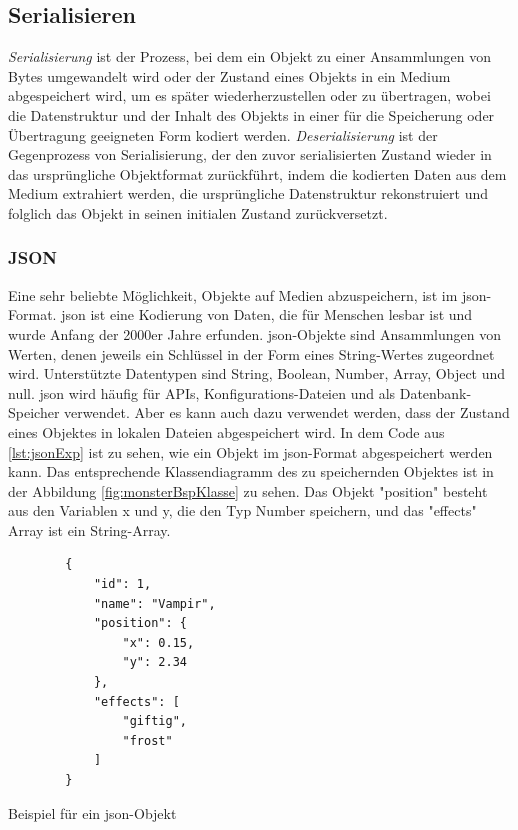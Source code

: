 \subsection{Serialisieren}

\textit{Serialisierung} ist der Prozess, bei dem ein Objekt zu einer Ansammlungen von Bytes umgewandelt wird oder der Zustand eines Objekts in ein Medium abgespeichert wird, um es später wiederherzustellen oder zu übertragen, wobei die Datenstruktur und der Inhalt des Objekts in einer für die Speicherung oder Übertragung geeigneten Form kodiert werden. \textit{Deserialisierung} ist der Gegenprozess von Serialisierung, der den zuvor serialisierten Zustand wieder in das ursprüngliche Objektformat zurückführt, indem die kodierten Daten aus dem Medium extrahiert werden, die ursprüngliche Datenstruktur rekonstruiert und folglich das Objekt in seinen initialen Zustand zurückversetzt.\cite{codeguruWorkingWith}

\subsubsection{JSON}
Eine sehr beliebte Möglichkeit, Objekte auf Medien abzuspeichern, ist im \ac{json}-Format. \ac{json} ist eine Kodierung von Daten, die für Menschen lesbar ist und wurde Anfang der 2000er Jahre erfunden. \ac{json}-Objekte sind Ansammlungen von Werten, denen jeweils ein Schlüssel in der Form eines String-Wertes zugeordnet wird. Unterstützte Datentypen sind String, Boolean, Number, Array, Object und null. \ac{json} wird häufig für APIs, Konfigurations-Dateien und als Datenbank-Speicher verwendet. Aber es kann auch dazu verwendet werden, dass der Zustand eines Objektes in lokalen Dateien abgespeichert wird.\cite{mongodbJSONBSON} 
In dem Code aus \ref{lst:jsonExp} ist zu sehen, wie ein Objekt im \ac{json}-Format abgespeichert werden kann. Das entsprechende Klassendiagramm des zu speichernden Objektes ist in der Abbildung \ref{fig:monsterBspKlasse} zu sehen. Das Objekt "position" besteht aus den Variablen x und y, die den Typ Number speichern, und das "effects" Array ist ein String-Array. 

\begin{listing}[htp]
    \begin{verbatim}
        {
            "id": 1,
            "name": "Vampir",
            "position": {
                "x": 0.15,
                "y": 2.34
            },
            "effects": [
                "giftig", 
                "frost"
            ]
        }
    \end{verbatim}
    \caption{Beispiel für ein \ac{json}-Objekt}
    \label{lst:jsonExp}
\end{listing}

